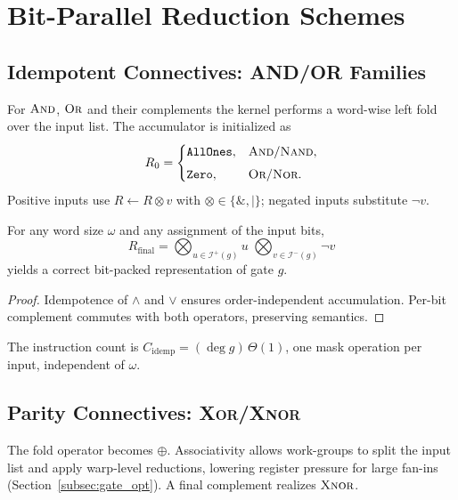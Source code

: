 \section{Bit\hyp{}Parallel Reduction Schemes}
\label{sec:gate_bitparallel}

\subsection{Idempotent Connectives: AND/OR Families}
\label{subsec:idempotent_connectives}

For $\textsc{And}$, $\textsc{Or}$ and their complements the kernel performs a
word\hyp{}wise left fold over the input list.  The accumulator is initialized
as
\[
  R_0 = \begin{cases}
           \texttt{AllOnes}, & \textsc{And}/\textsc{Nand},\\[4pt]
           \texttt{Zero},    & \textsc{Or}/\textsc{Nor}.
         \end{cases}
\]
Positive inputs use $R\gets R\otimes v$ with $\otimes\in\{\&,|\}$; negated
inputs substitute $\lnot v$.

\begin{lemma}
For any word size $\omega$ and any assignment of the input bits,
\[
  R_{\mathrm{final}}
  = \bigotimes_{u\in\mathcal{I}^{+}(g)} u\;
    \bigotimes_{v\in\mathcal{I}^{-}(g)} \lnot v
\]
yields a correct bit\hyp{}packed representation of gate $g$.
\end{lemma}

\begin{proof}
Idempotence of $\land$ and $\lor$ ensures order\hyp{}independent accumulation.
Per\hyp{}bit complement commutes with both operators, preserving semantics.
\end{proof}

The instruction count is $C_{\text{idemp}}=(\deg g)\,\Theta(1)$, one mask
operation per input, independent of $\omega$.

\subsection{Parity Connectives: \textsc{Xor}/\textsc{Xnor}}
\label{subsec:parity_connectives}

The fold operator becomes $\oplus$.  Associativity allows work\hyp{}groups to
split the input list and apply warp\hyp{}level reductions, lowering register
pressure for large fan\hyp{}ins (Section~\ref{subsec:gate_opt}).
A final complement realizes $\textsc{Xnor}$.

